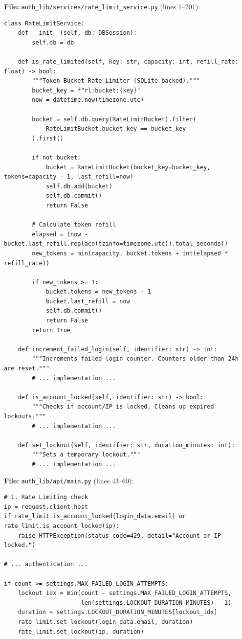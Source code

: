 \documentclass[11pt,a4paper]{article}
\begin{document}
\textbf{File:} \texttt{auth\_lib/services/rate\_limit\_service.py} (lines 1--201):
\begin{lstlisting}
class RateLimitService:
    def __init__(self, db: DBSession):
        self.db = db

    def is_rate_limited(self, key: str, capacity: int, refill_rate: float) -> bool:
        """Token Bucket Rate Limiter (SQLite-backed)."""
        bucket_key = f"rl:bucket:{key}"
        now = datetime.now(timezone.utc)
        
        bucket = self.db.query(RateLimitBucket).filter(
            RateLimitBucket.bucket_key == bucket_key
        ).first()
        
        if not bucket:
            bucket = RateLimitBucket(bucket_key=bucket_key, tokens=capacity - 1, last_refill=now)
            self.db.add(bucket)
            self.db.commit()
            return False
        
        # Calculate token refill
        elapsed = (now - bucket.last_refill.replace(tzinfo=timezone.utc)).total_seconds()
        new_tokens = min(capacity, bucket.tokens + int(elapsed * refill_rate))
        
        if new_tokens >= 1:
            bucket.tokens = new_tokens - 1
            bucket.last_refill = now
            self.db.commit()
            return False
        return True

    def increment_failed_login(self, identifier: str) -> int:
        """Increments failed login counter. Counters older than 24h are reset."""
        # ... implementation ...

    def is_account_locked(self, identifier: str) -> bool:
        """Checks if account/IP is locked. Cleans up expired lockouts."""
        # ... implementation ...

    def set_lockout(self, identifier: str, duration_minutes: int):
        """Sets a temporary lockout."""
        # ... implementation ...
\end{lstlisting}

\textbf{File:} \texttt{auth\_lib/api/main.py} (lines 43--60):
\begin{lstlisting}
# 1. Rate Limiting check
ip = request.client.host
if rate_limit.is_account_locked(login_data.email) or rate_limit.is_account_locked(ip):
    raise HTTPException(status_code=429, detail="Account or IP locked.")

# ... authentication ...

if count >= settings.MAX_FAILED_LOGIN_ATTEMPTS:
    lockout_idx = min(count - settings.MAX_FAILED_LOGIN_ATTEMPTS, 
                      len(settings.LOCKOUT_DURATION_MINUTES) - 1)
    duration = settings.LOCKOUT_DURATION_MINUTES[lockout_idx]
    rate_limit.set_lockout(login_data.email, duration)
    rate_limit.set_lockout(ip, duration)
\end{lstlisting}
\end{document}
